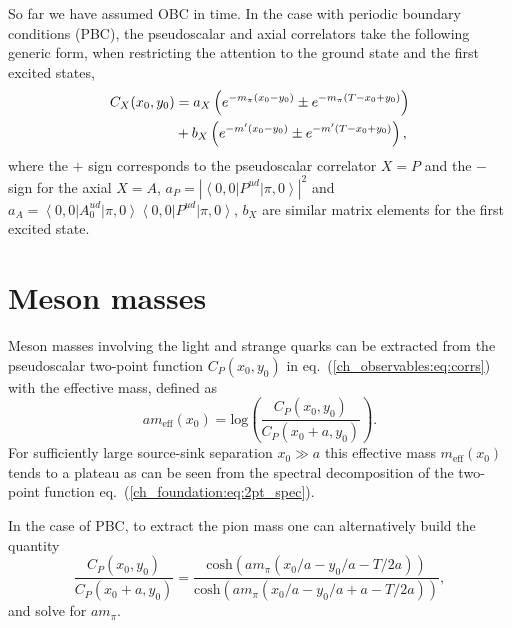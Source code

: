 So far we have assumed OBC in time. In the case with periodic boundary conditions (PBC), the pseudoscalar and axial correlators take the following generic form, when restricting the attention to the ground state and the first excited states,
\begin{align}
\label{ch_observables:eq:corrs_PBC}
C_X(x_0,y_0)&=a_X\left(e^{-m_{\pi}(x_0-y_0)}\pm e^{-m_{\pi}(T-x_0+y_0)}\right) \notag \\
&+b_X\left(e^{-m'(x_0-y_0)}\pm e^{-m'(T-x_0+y_0)}\right),
\end{align}
where the $+$ sign corresponds to the pseudoscalar correlator $X=P$ and the $-$ sign for the axial $X=A$,  $a_P=|\left<0,0\right|P^{ud}\left|\pi,0\right>|^2$ and $a_A=\left<0,0\right|A_0^{ud}\left|\pi,0\right>\left<0,0\right|P^{ud}\left|\pi,0\right>$, $b_X$ are similar matrix elements for the first excited state. 


\section{Meson masses}
\label{ch_observables:sec:meson_mass}

Meson masses involving the light and strange quarks can be extracted from the pseudoscalar two-point function $C_P(x_0,y_0)$ in eq.~(\ref{ch_observables:eq:corrs}) with the effective mass, defined as
\begin{equation}
\label{ch_observables:eq:meff}
am_{\textrm{eff}}(x_0)={\textrm{log}}\left(\frac{C_P(x_0,y_0)}{C_P(x_0+a,y_0)}\right).
\end{equation}
For sufficiently large source-sink separation $x_0\gg a$ this effective mass $m_{\textrm{eff}}(x_0)$ tends to a plateau as can be seen from the spectral decomposition of the two-point function eq.~(\ref{ch_foundation:eq:2pt_spec}).

In the case of PBC, to extract the pion mass one can alternatively build the quantity
\begin{equation}
\label{ch_observables:eq:meff_PBC}
\frac{C_P(x_0,y_0)}{C_P(x_0+a,y_0)}=\frac{{\textrm{cosh}}(am_{\pi}(x_0/a-y_0/a-T/2a))}{{\textrm{cosh}}(am_{\pi}(x_0/a-y_0/a+a-T/2a))},
\end{equation}
and solve for $am_{\pi}$.

